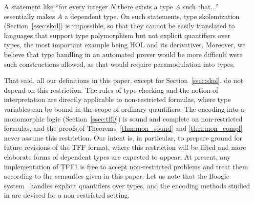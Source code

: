A statement like ``for every integer $N$ there exists a type
$A$ such that...'' essentially makes $A$ a dependent type.
On such statements, type skolemization (Section~\ref{ssec:skol})
is impossible, so that they cannot be easily translated to languages
that support type polymorphism but not explicit quantifiers over
types, the most important example being HOL and its derivatives.
Moreover, we believe that type handling in an automated prover
would be more difficult were such constructions allowed,
as that would require paramodulation into types.

That said, all our definitions in this paper, except for
Section~\ref{ssec:skol}, do not depend on this restriction.
The rules of type checking and the notion of interpretation
are directly applicable to non-restricted formulas, where
type variables can be bound in the scope of ordinary quantifiers.
The encoding into a monomorphic logic (Section~\ref{ssec:tff0})
is sound and complete on non-restricted formulas, and the proofs of
Theorems~\ref{thm:mon_sound} and \ref{thm:mon_compl} never assume
this restriction.
Our intent is, in particular, to prepare ground for future revisions
of the TFF format, where this restriction will be lifted and more
elaborate forms of dependent types are expected to appear.
At present, any implementation of TFF1 is free to accept
non-restricted problems and treat them according to the semantics
given in this paper.
Let us note that the Boogie
system~\cite{Barnett06boogie} handles explicit quantifiers over types,
and the encoding methods studied in \cite{leino10tacas} are devised
for a non-restricted setting.


